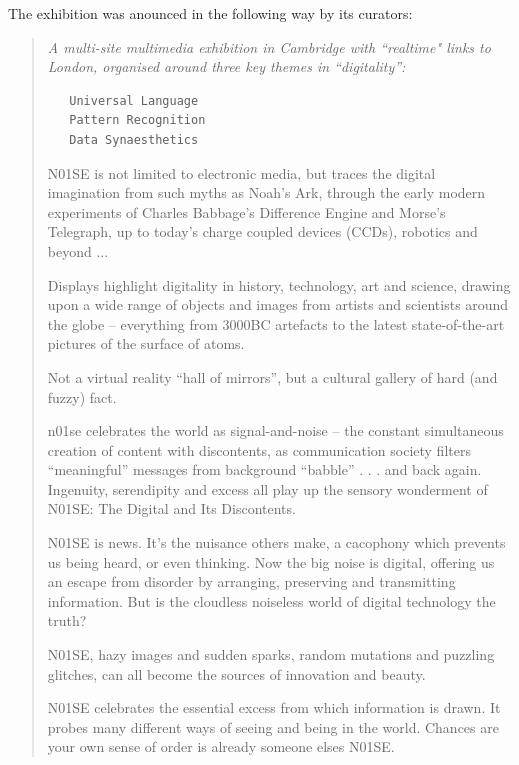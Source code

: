 The exhibition was anounced in the following way by its curators: 
\begin{quotation}
{\itshape A multi-site multimedia exhibition in Cambridge with ``realtime" links to London, organised around three key themes in ``digitality'':

\begin{verbatim}
   Universal Language 
   Pattern Recognition 
   Data Synaesthetics
\end{verbatim} 

N01SE is not limited to electronic media, but traces the digital imagination from such myths as Noah's Ark, through the early modern experiments of Charles Babbage's Difference Engine and Morse's Telegraph, up to today's charge coupled devices (CCDs), robotics and beyond ...

Displays highlight digitality in history, technology, art and science, drawing upon a wide range of objects and images from artists and scientists around the globe -- everything from 3000BC artefacts to the latest state-of-the-art pictures of the surface of atoms. 

Not a virtual reality ``hall of mirrors'', but a cultural gallery of hard (and fuzzy) fact.

n01se celebrates the world as signal-and-noise -- the constant simultaneous creation of content with discontents, as communication society filters ``meaningful'' messages from background ``babble'' . . . and back again. Ingenuity, serendipity and excess all play up the sensory wonderment of N01SE: The Digital and Its Discontents.

N01SE is news. It's the nuisance others make, a cacophony which prevents us being heard, or even thinking. 
Now the big noise is digital, offering us an escape from disorder by arranging, preserving and transmitting 
information. But is the cloudless noiseless world of digital technology the truth? 

N01SE, hazy images and sudden sparks, random mutations and puzzling glitches, can all become the sources of innovation 
and beauty. 

N01SE celebrates the essential excess from which information is drawn. It probes many different ways of seeing and 
being in the world. Chances are your own sense of order is already someone elses N01SE.}
\end{quotation}


